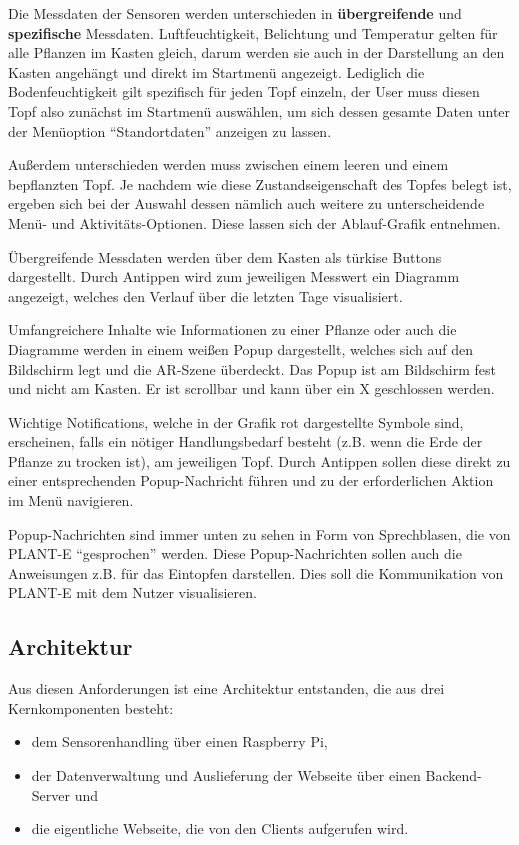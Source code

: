 Die Messdaten der Sensoren werden unterschieden in
\textbf{übergreifende} und \textbf{spezifische} Messdaten.
Luftfeuchtigkeit, Belichtung und Temperatur gelten für alle Pflanzen im
Kasten gleich, darum werden sie auch in der Darstellung an den Kasten
angehängt und direkt im Startmenü angezeigt. Lediglich die
Bodenfeuchtigkeit gilt spezifisch für jeden Topf einzeln, der User muss
diesen Topf also zunächst im Startmenü auswählen, um sich dessen gesamte
Daten unter der Menüoption ``Standortdaten'' anzeigen zu lassen.

Außerdem unterschieden werden muss zwischen einem leeren und einem
bepflanzten Topf. Je nachdem wie diese Zustandseigenschaft des Topfes
belegt ist, ergeben sich bei der Auswahl dessen nämlich auch weitere zu
unterscheidende Menü- und Aktivitäts-Optionen. Diese lassen sich der
Ablauf-Grafik entnehmen.

Übergreifende Messdaten werden über dem Kasten als türkise Buttons
dargestellt. Durch Antippen wird zum jeweiligen Messwert ein Diagramm
angezeigt, welches den Verlauf über die letzten Tage visualisiert.

Umfangreichere Inhalte wie Informationen zu einer Pflanze oder auch die
Diagramme werden in einem weißen Popup dargestellt, welches sich auf den
Bildschirm legt und die AR-Szene überdeckt. Das Popup ist am Bildschirm
fest und nicht am Kasten. Er ist scrollbar und kann über ein X
geschlossen werden.

Wichtige Notifications, welche in der Grafik rot dargestellte Symbole
sind, erscheinen, falls ein nötiger Handlungsbedarf besteht (z.B. wenn
die Erde der Pflanze zu trocken ist), am jeweiligen Topf. Durch Antippen
sollen diese direkt zu einer entsprechenden Popup-Nachricht führen und
zu der erforderlichen Aktion im Menü navigieren.

Popup-Nachrichten sind immer unten zu sehen in Form von Sprechblasen,
die von PLANT-E ``gesprochen'' werden. Diese Popup-Nachrichten sollen
auch die Anweisungen z.B. für das Eintopfen darstellen. Dies soll die
Kommunikation von PLANT-E mit dem Nutzer visualisieren.

\hypertarget{architektur}{%
\subsection{Architektur}\label{architektur}}

Aus diesen Anforderungen ist eine Architektur entstanden, die aus drei
Kernkomponenten besteht:

\begin{itemize}
\tightlist
\item
  dem Sensorenhandling über einen Raspberry Pi,
\item
  der Datenverwaltung und Auslieferung der Webseite über einen
  Backend-Server und
\item
  die eigentliche Webseite, die von den Clients aufgerufen wird.
\end{itemize}

